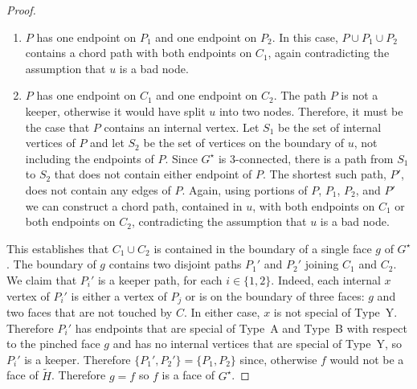 \documentclass{patmorin}
\newcommand{\dual}[1]{{#1}^\star}
\begin{document}
\begin{proof}
\begin{enumerate}
       \item $P$ has one endpoint on $P_1$ and one endpoint on $P_2$.
       In this case, $P\cup P_1\cup P_2$ contains a chord path with both
       endpoints on $C_1$, again contradicting the assumption that $u$
       is a bad node.

       \item $P$ has one endpoint on $C_1$ and one endpoint on $C_2$.
       The path $P$ is not a keeper, otherwise it would have split $u$
       into two nodes.	Therefore, it must be the case that $P$ contains
       an internal vertex.  Let $S_1$ be the set of internal vertices
       of $P$ and let $S_2$ be the set of vertices on the boundary
       of $u$, not including the endpoints of $P$.  Since $\dual{G}$
       is 3-connected, there is a path from $S_1$ to $S_2$ that does
       not contain either endpoint of $P$.  The shortest such path, $P'$,
       does not contain any edges of $P$.  Again, using portions of $P$,
       $P_1$, $P_2$, and $P'$ we can construct a chord path, contained
       in $u$, with both endpoints on $C_1$ or both endpoints on $C_2$,
       contradicting the assumption that $u$ is a bad node.
\end{enumerate}
    This establishes that $C_1\cup C_2$ is contained in the boundary of a single face $g$ of $\dual{G}$.  The boundary of $g$ contains two disjoint paths $P_1'$ and $P_2'$ joining $C_1$ and $C_2$.  We claim that $P_i'$ is a keeper path, for each $i\in\{1,2\}$.  Indeed, each internal $x$ vertex of $P_i'$ is either a vertex of $P_j$ or is on the boundary of three faces: $g$ and two faces that are not touched by $C$.  In either case, $x$ is not special of Type~Y.  Therefore $P_i'$ has endpoints that are special of Type~A and Type~B with respect to the pinched face $g$ and has no internal vertices that are special of Type~Y, so $P_i'$ is a keeper.  Therefore $\{P_1',P_2'\}=\{P_1,P_2\}$ since, otherwise $f$ would not be a face of $\tilde{H}$.  Therefore $g=f$ so $f$ is a face of $\dual{G}$.
\end{proof}

\end{document}

